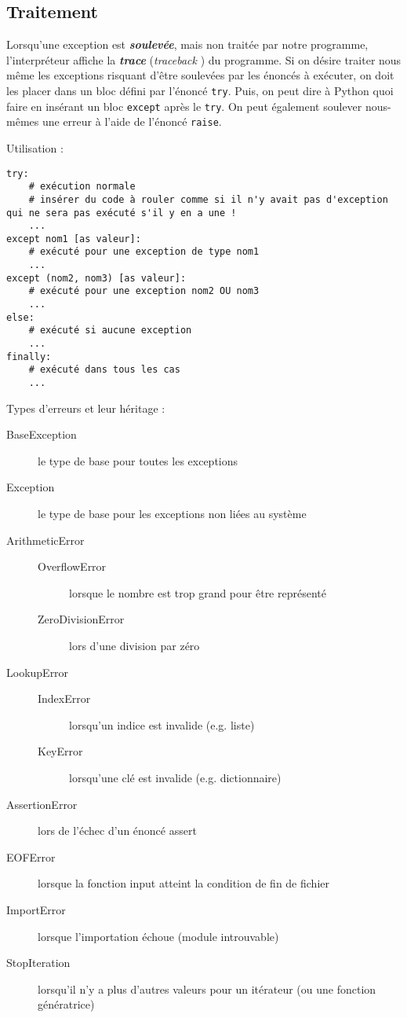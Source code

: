 \documentclass[10pt, french]{article}
\begin{document}
\begin{multicols*}{2}
\subsection{Traitement}
\begin{rappel_enhanced}[Contexte]
Lorsqu'une exception est \textbf{\textit{soulevée}}, mais non traitée par notre programme, l'interpréteur affiche la \textbf{\textit{trace}} (\og \textit{traceback} \fg{}) du programme. Si on désire traiter nous même les exceptions risquant d'être soulevées par les énoncés à exécuter, on doit les placer dans un bloc défini par l'énoncé \texttt{try}. Puis, on peut dire à Python quoi faire en insérant un bloc \texttt{except} après le \texttt{try}. On peut également soulever nous-mêmes une erreur à l'aide de l'énoncé \texttt{raise}.
\end{rappel_enhanced}

Utilisation :
\begin{lstlisting}
try:
    # exécution normale
    # insérer du code à rouler comme si il n'y avait pas d'exception qui ne sera pas exécuté s'il y en a une !
    ...
except nom1 [as valeur]:
    # exécuté pour une exception de type nom1
    ...
except (nom2, nom3) [as valeur]:
    # exécuté pour une exception nom2 OU nom3
    ...
else:
    # exécuté si aucune exception
    ...
finally:
    # exécuté dans tous les cas
    ...
\end{lstlisting}

\bigskip

Types d'erreurs et leur héritage :
\begin{description}
	\item[BaseException]	le type de base pour toutes les exceptions
	\item[Exception]	le type de base pour les exceptions non liées au système
	\item[ArithmeticError]	
		\begin{description}
		\item[OverflowError]	lorsque le nombre est trop grand pour être représenté
		\item[ZeroDivisionError]	lors d'une division par zéro
		\end{description}
	\item[LookupError]	
		\begin{description}
		\item[IndexError]	lorsqu'un indice est invalide (e.g. liste)
		\item[KeyError]	lorsqu'une clé est invalide (e.g. dictionnaire)
		\end{description}
	\item[AssertionError]	lors de l'échec d'un énoncé assert
	\item[EOFError]	lorsque la fonction input atteint la condition de fin de fichier
	\item[ImportError]	lorsque l'importation échoue (module introuvable)
	\item[StopIteration]	lorsqu'il n'y a plus d'autres valeurs pour un itérateur (ou une fonction génératrice)
\end{description}


\end{multicols*}
\end{document}
